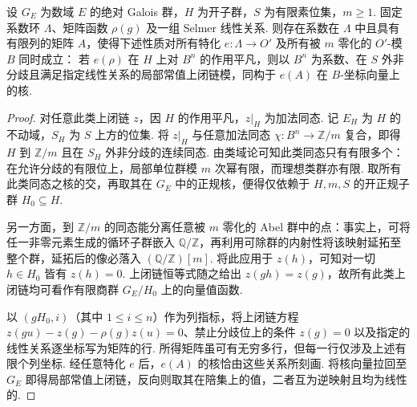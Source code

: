 \begin{lemma}
\label{lem:c-selmer-finite-quotient}
\emitthmsource
设 $G_E$ 为数域 $E$ 的绝对 Galois 群，$H$ 为开子群，$S$ 为有限素位集，$m\ge1$.
固定系数环 $\Lambda$、矩阵函数 $\rho(g)$ 及一组 Selmer 线性关系.
则存在系数在 $\Lambda$ 中且具有有限列的矩阵 $A$，使得下述性质对所有特化 $e:\Lambda\to O'$ 及所有被 $m$ 零化的 $O'$-模 $B$ 同时成立：
若 $e(\rho)$ 在 $H$ 上对 $B^n$ 的作用平凡，则以 $B^n$ 为系数、在 $S$ 外非分歧且满足指定线性关系的局部常值上闭链模，同构于 $e(A)$ 在 $B$-坐标向量上的核.
\end{lemma}
\begin{proof}
对任意此类上闭链 $z$，因 $H$ 的作用平凡，$z|_H$ 为加法同态.
记 $E_H$ 为 $H$ 的不动域，$S_H$ 为 $S$ 上方的位集.
将 $z|_H$ 与任意加法同态 $\chi:B^n\to\mathbb Z/m$ 复合，即得 $H$ 到 $\mathbb Z/m$ 且在 $S_H$ 外非分歧的连续同态.
由类域论可知此类同态只有有限多个：在允许分歧的有限位上，局部单位群模 $m$ 次幂有限，而理想类群亦有限.
取所有此类同态之核的交，再取其在 $G_E$ 中的正规核，便得仅依赖于 $H,m,S$ 的开正规子群 $H_0\subseteq H$.

另一方面，到 $\mathbb Z/m$ 的同态能分离任意被 $m$ 零化的 Abel 群中的点：事实上，可将任一非零元素生成的循环子群嵌入 $\mathbb Q/\mathbb Z$，再利用可除群的内射性将该映射延拓至整个群，延拓后的像必落入 $(\mathbb Q/\mathbb Z)[m]$.
将此应用于 $z(h)$，可知对一切 $h\in H_0$ 皆有 $z(h)=0$.
上闭链恒等式随之给出 $z(gh)=z(g)$，故所有此类上闭链均可看作有限商群 $G_E/H_0$ 上的向量值函数.

以 $(gH_0,i)$（其中 $1\le i\le n$）作为列指标，将上闭链方程 $z(gu)-z(g)-\rho(g)z(u)=0$、禁止分歧位上的条件 $z(g)=0$ 以及指定的线性关系逐坐标写为矩阵的行.
所得矩阵虽可有无穷多行，但每一行仅涉及上述有限个列坐标.
经任意特化 $e$ 后，$e(A)$ 的核恰由这些关系所刻画.
将核向量拉回至 $G_E$ 即得局部常值上闭链，反向则取其在陪集上的值，二者互为逆映射且均为线性的.
\end{proof}


